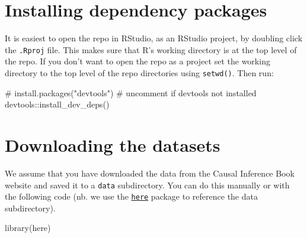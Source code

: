 \documentclass[
  10pt,
  a4paper,
]{book}
\newenvironment{Shaded}{\begin{snugshade}}{\end{snugshade}}
\newcommand{\CommentTok}[1]{\textcolor[rgb]{0.37,0.37,0.37}{#1}}
\newcommand{\FunctionTok}[1]{\textcolor[rgb]{0.28,0.35,0.67}{#1}}
\newcommand{\NormalTok}[1]{\textcolor[rgb]{0.00,0.46,0.62}{#1}}
\newcommand{\SpecialCharTok}[1]{\textcolor[rgb]{0.37,0.37,0.37}{#1}}
\begin{document}
\section{Installing dependency packages}\label{installing-dependency-packages}

It is easiest to open the repo in RStudio, as an RStudio project, by doubling click the \texttt{.Rproj} file. This makes sure that R's working directory is at the top level of the repo. If you don't want to open the repo as a project set the working directory to the top level of the repo directories using \texttt{setwd()}. Then run:

\begin{Shaded}
\begin{Highlighting}[]
\CommentTok{\# install.packages("devtools") \# uncomment if devtools not installed}
\NormalTok{devtools}\SpecialCharTok{::}\FunctionTok{install\_dev\_deps}\NormalTok{()}
\end{Highlighting}
\end{Shaded}

\section{Downloading the datasets}\label{downloading-the-datasets}

We assume that you have downloaded the data from the Causal Inference Book website and saved it to a \texttt{data} subdirectory. You can do this manually or with the following code (nb. we use the \href{https://here.r-lib.org/}{\texttt{here}} package to reference the data subdirectory).

\begin{Shaded}
\begin{Highlighting}[]
\FunctionTok{library}\NormalTok{(here)}
\end{Highlighting}
\end{Shaded}
\end{document}
